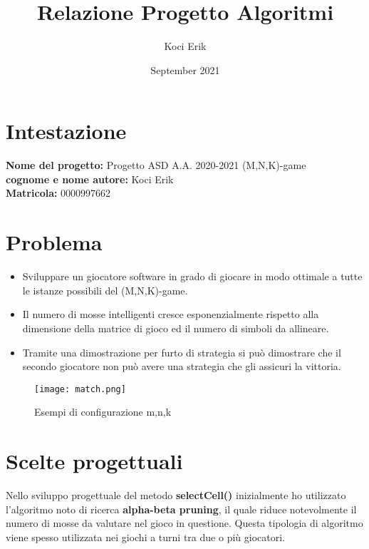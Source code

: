 \documentclass{article}
\title{Relazione Progetto Algoritmi}
\author{Koci Erik}
\date{September 2021}
\begin{document}
\maketitle
\section{Intestazione}
\textbf{Nome del progetto:} Progetto ASD A.A. 2020-2021 (M,N,K)-game\\
\textbf{cognome e nome autore:} Koci Erik\\
\textbf{Matricola:} 0000997662

\section{Problema}
\begin{itemize}
    \item Sviluppare un giocatore software in grado di giocare in modo ottimale a tutte le istanze possibili del (M,N,K)-game.
    \item Il numero di mosse intelligenti cresce esponenzialmente rispetto alla dimensione della matrice di gioco ed il numero di simboli da allineare.
    \item Tramite una dimostrazione per furto di strategia si può dimostrare che il secondo giocatore non può avere una strategia che gli assicuri la vittoria.
\end{itemize}

\begin{figure}[h!]
\centering
\texttt{[image: match.png]}
\caption{Esempi di configurazione m,n,k}
\label{fig:universe}
\end{figure}

\section{Scelte progettuali}
    Nello sviluppo progettuale del metodo \textbf{selectCell()} inizialmente ho utilizzato l'algoritmo noto di ricerca \textbf{alpha-beta pruning}, il quale riduce notevolmente il numero di mosse da valutare nel gioco in questione. Questa tipologia di algoritmo viene spesso utilizzata nei giochi a turni tra due o più giocatori.
\end{document}
